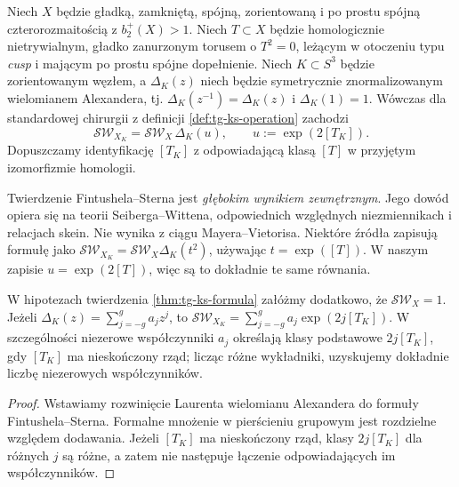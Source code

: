 \begin{twierdzenie}
\label{thm:tg-ks-formula}
Niech $X$ będzie gładką, zamkniętą, spójną,
zorientowaną i po prostu spójną czterorozmaitością
z $b_2^+(X)>1$. Niech $T\subset X$ będzie homologicznie
nietrywialnym, gładko zanurzonym torusem o $T^2=0$,
leżącym w otoczeniu typu \emph{cusp} i mającym
po prostu spójne dopełnienie. Niech
$K\subset S^3$ będzie zorientowanym węzłem,
a $\Delta_K(z)$ niech będzie symetrycznie
znormalizowanym wielomianem Alexandera, tj.
$\Delta_K(z^{-1})=\Delta_K(z)$ i $\Delta_K(1)=1$.
Wówczas dla standardowej chirurgii z definicji
\ref{def:tg-ks-operation} zachodzi
\[
\mathcal{SW}_{X_K}=\mathcal{SW}_X\,\Delta_K(u),
\qquad u:=\exp(2[T_K]).
\]
Dopuszczamy identyfikację $[T_K]$ z odpowiadającą
klasą $[T]$ w przyjętym izomorfizmie homologii.
\end{twierdzenie}

\begin{uwaga}
Twierdzenie Fintushela--Sterna jest \emph{głębokim
wynikiem zewnętrznym}. Jego dowód opiera się na teorii
Seiberga--Wittena, odpowiednich względnych niezmiennikach
i relacjach skein. Nie wynika z ciągu Mayera--Vietorisa.
Niektóre źródła zapisują formułę jako
$\mathcal{SW}_{X_K}=\mathcal{SW}_X\Delta_K(t^2)$,
używając $t=\exp([T])$. W naszym zapisie
$u=\exp(2[T])$, więc są to dokładnie te same równania.
\end{uwaga}

\begin{stwierdzenie}
\label{prop:tg-ks-basic}
W hipotezach twierdzenia \ref{thm:tg-ks-formula}
załóżmy dodatkowo, że $\mathcal{SW}_X=1$.
Jeżeli $\Delta_K(z)=\sum_{j=-g}^{g}a_jz^j$,
to $\mathcal{SW}_{X_K}=\sum_{j=-g}^{g}a_j\exp(2j[T_K])$.
W szczególności niezerowe współczynniki $a_j$
określają klasy podstawowe $2j[T_K]$, gdy
$[T_K]$ ma nieskończony rząd; licząc różne wykładniki,
uzyskujemy dokładnie liczbę niezerowych współczynników.
\end{stwierdzenie}

\begin{proof}
Wstawiamy rozwinięcie Laurenta wielomianu Alexandera
do formuły Fintushela--Sterna. Formalne mnożenie
w pierścieniu grupowym jest rozdzielne względem dodawania.
Jeżeli $[T_K]$ ma nieskończony rząd, klasy $2j[T_K]$
dla różnych $j$ są różne, a zatem nie następuje
łączenie odpowiadających im współczynników.
\end{proof}


